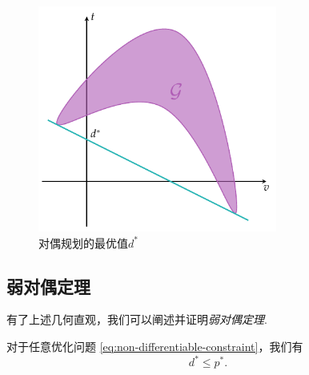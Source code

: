 \begin{figure}[htbp]
    \centering
    \includegraphics[width=0.7\textwidth]{figures/duality/duality-dual-d-star.pdf}
    \caption{对偶规划的最优值$d^*$}
    \label{fig:duality-dual-d-star}
\end{figure}

\subsection{弱对偶定理}

有了上述几何直观，我们可以阐述并证明\textit{弱对偶定理}.

\begin{theorem}[弱对偶定理]\label{thm:weak-duality}
    对于任意优化问题 \eqref{eq:non-differentiable-constraint}，我们有
    \[d^*\leq p^*.\]
\end{theorem}

